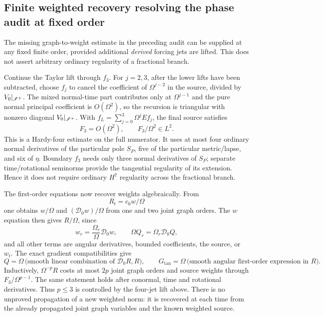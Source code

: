 \subsection{Finite weighted recovery resolving the phase audit at fixed order}
The missing graph-to-weight estimate in the preceding audit can be supplied at any fixed finite order, provided additional \emph{derived} forcing jets are lifted. This does not assert arbitrary ordinary regularity of a fractional branch.

Continue the Taylor lift through $f_3$. For $j=2,3$, after the lower lifts have been subtracted, choose $f_j$ to cancel the coefficient of $\Omega^{j-2}$ in the source, divided by $V_0|_{\mathscr I^+}$. The mixed normal-time part contributes only at $\Omega^{j-1}$ and the pure normal principal coefficient is $O(\Omega^2)$, so the recursion is triangular with nonzero diagonal $V_0|_{\mathscr I^+}$. With $f_L=\sum_{j=0}^3\Omega^jEf_j$, the final source satisfies
\[
 F_3=O(\Omega^2),\qquad F_3/\Omega^2\in L^2.
\]
This is a Hardy-four estimate on the full numerator. It uses at most four ordinary normal derivatives of the particular pole $S_P$, five of the particular metric/lapse, and six of $\eta$. Boundary $f_3$ needs only three normal derivatives of $S_P$; separate time/rotational seminorms provide the tangential regularity of its extension. Hence it does not require ordinary $H^7$ regularity across the fractional branch.

The first-order equations now recover weights algebraically. From
\[
 R_t=c_0w/\Omega
\]
one obtains $w/\Omega$ and $(\mathcal D_0w)/\Omega$ from one and two joint graph orders. The $w$ equation then gives $R/\Omega$, since
\[
 w_r=\frac{\Omega_r}{\Omega}\mathcal D_0w,
 \qquad \Omega Q_r=\Omega_r\mathcal D_0Q,
\]
and all other terms are angular derivatives, bounded coefficients, the source, or $w_t$. The exact gradient compatibilities give
\[
 Q=\Omega\,\text{(smooth linear combination of }\mathcal D_0R,R),
 \qquad G_{\tan}=\Omega\,\text{(smooth angular first-order expression in }R).
\]
Inductively, $\Omega^{-p}R$ costs at most $2p$ joint graph orders and source weights through $F_3/\Omega^{p-1}$. The same statement holds after conormal, time and rotational derivatives. Thus $p\le3$ is controlled by the four-jet lift above. There is no unproved propagation of a new weighted norm: it is recovered at each time from the already propagated joint graph variables and the known weighted source.

